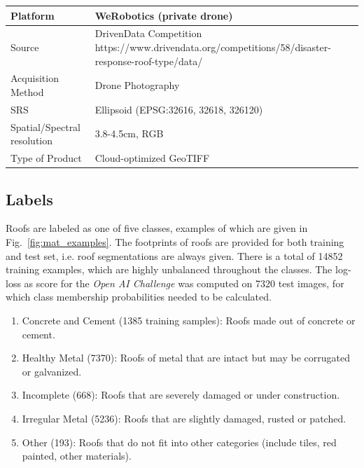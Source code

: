 \documentclass[11pt]{article}
\begin{document}
	\begin{center}
		\bgroup
		\def\arraystretch{1.1}
		\begin{tabular}{ | m{5cm} | m{10cm}|} 
			\hline
			Platform & WeRobotics (private drone)  \\ 
			\hline
			Source & DrivenData Competition \newline https://www.drivendata.org/competitions/58/disaster-response-roof-type/data/ \\ 
			\hline
			Acquisition Method & Drone Photography  \\ 
			\hline
			SRS  & Ellipsoid (EPSG:32616, 32618, 326120)  \\ 
			\hline
			Spatial/Spectral resolution & 3.8-4.5cm, RGB  \\ 
			\hline
			Type of Product & Cloud-optimized GeoTIFF \\ 
			\hline
		\end{tabular}
		\egroup		
		\label{tab:general}
	\end{center}
	
	\subsection{Labels}
	Roofs are labeled as one of five classes, examples of which are given in Fig.~\ref{fig:mat_examples}. The footprints of roofs are provided for both training and test set, i.e. roof segmentations are always given. There is a total of 14852 training examples, which are highly unbalanced throughout the classes.
	The log-loss as score for the \textit{Open AI Challenge} was computed on 7320 test images, for which class membership probabilities needed to be calculated.
	
	\begin{enumerate}
		\itemsep0em
		\item Concrete and Cement (1385 training samples): Roofs made out of concrete or cement.
		\item Healthy Metal (7370): Roofs of metal that are intact but may be corrugated or galvanized.
		\item Incomplete (668): Roofs that are severely damaged or under construction.
		\item Irregular Metal (5236): Roofs that are slightly damaged, rusted or patched.
		\item Other (193): Roofs that do not fit into other categories (include tiles, red painted, other materials).
	\end{enumerate}
\end{document}
